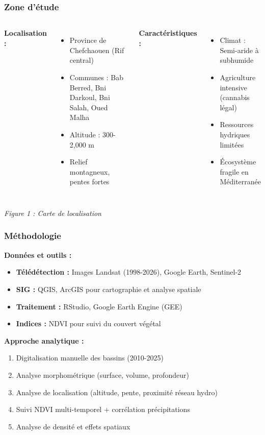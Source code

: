 \documentclass{beamer}
\begin{document}
\begin{frame}
\frametitle{Zone d'étude}
\begin{columns}[T]
  \textbf{Localisation :}
  \begin{itemize}
    \item Province de Chefchaouen (Rif central)
    \item Communes : Bab Berred, Bni Darkoul, Bni Salah, Oued Malha
    \item Altitude : 300-2,000 m
    \item Relief montagneux, pentes fortes
  \end{itemize}

  \textbf{Caractéristiques :}
  \begin{itemize}
    \item Climat : Semi-aride à subhumide
    \item Agriculture intensive (cannabis légal)
    \item Ressources hydriques limitées
    \item Écosystème fragile en Méditerranée
  \end{itemize}
\end{columns}

\begin{center}
  \small{\textit{Figure 1 : Carte de localisation}}
\end{center}
\end{frame}

\begin{frame}
\frametitle{Méthodologie}
\textbf{Données et outils :}
\begin{itemize}
  \item \textbf{Télédétection :} Images Landsat (1998-2026), Google Earth, Sentinel-2
  \item \textbf{SIG :} QGIS, ArcGIS pour cartographie et analyse spatiale
  \item \textbf{Traitement :} RStudio, Google Earth Engine (GEE)
  \item \textbf{Indices :} NDVI pour suivi du couvert végétal
\end{itemize}

\textbf{Approche analytique :}
\begin{enumerate}
  \item Digitalisation manuelle des bassins (2010-2025)
  \item Analyse morphométrique (surface, volume, profondeur)
  \item Analyse de localisation (altitude, pente, proximité réseau hydro)
  \item Suivi NDVI multi-temporel + corrélation précipitations
  \item Analyse de densité et effets spatiaux
\end{enumerate}
\end{frame}
\end{document}
